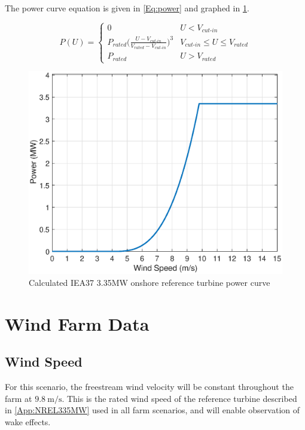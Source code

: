 \documentclass[12pt]{article}
\begin{document}
    \noindent The power curve equation is given in \cref{Eq:power} and graphed in \cref{Fig:curve}.
    
    \begin{equation}
        P(U) = 
            \begin{cases} 
                  0 & U < V_{\textit{cut-in}} \\
                  P_{\textit{rated}}\bigg(\frac{U-V_{\textit{cut-in}}}{V_{\textit{rated}}-V_{\textit{cut-in}}}\bigg)^3 & V_{\textit{cut-in}}\leq U \leq V_{\textit{rated}} \\
                  P_{\textit{rated}} & U > V_{\textit{rated}}
            \end{cases}
        \label{Eq:power}
    \end{equation}
    
    \begin{figure}[H]
        \centering
        \caption{Calculated IEA37 3.35MW onshore reference turbine power curve \label{Fig:curve}}
        \includegraphics[width=0.75\linewidth]{power-curve.eps}
    \end{figure}

\newpage
\section{Wind Farm Data}
    \subsection{Wind Speed}
        For this scenario, the freestream wind velocity will be constant throughout the farm at $9.8\ \textrm{m/s}$. This is the rated wind speed of the reference turbine described in \cref{App:NREL335MW} used in all farm scenarios, and will enable observation of wake effects.
    
\end{document}
